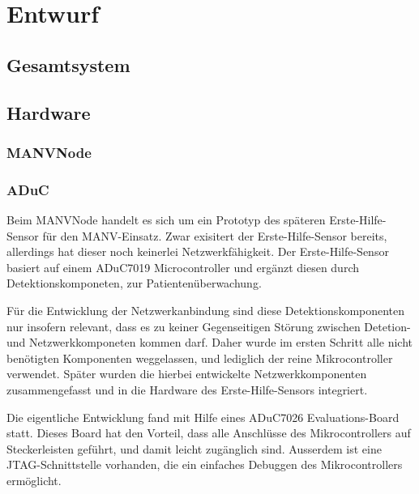 

\chapter{Entwurf}

\section{Gesamtsystem}
\begin{center}
{}
\end{center}


\section{Hardware}
\subsection{MANVNode}

\subsection{ADuC}
Beim MANVNode handelt es sich um ein Prototyp des späteren Erste-Hilfe-Sensor für den MANV-Einsatz. Zwar exisitert der 
Erste-Hilfe-Sensor bereits, allerdings hat dieser noch keinerlei Netzwerkfähigkeit. Der Erste-Hilfe-Sensor basiert
auf einem ADuC7019 Microcontroller und ergänzt diesen durch Detektionskomponeten, zur Patientenüberwachung.

Für die Entwicklung der Netzwerkanbindung sind diese Detektionskomponenten nur insofern relevant, dass es zu keiner
Gegenseitigen Störung zwischen Detetion- und Netzwerkkomponeten kommen darf. Daher wurde im ersten Schritt alle nicht
benötigten Komponenten weggelassen, und lediglich der reine Mikrocontroller verwendet. Später wurden die hierbei
entwickelte Netzwerkkomponenten zusammengefasst und in die Hardware des Erste-Hilfe-Sensors integriert.

Die eigentliche Entwicklung fand mit Hilfe eines ADuC7026 Evaluations-Board statt. Dieses Board hat den Vorteil, 
dass alle Anschlüsse des Mikrocontrollers auf Steckerleisten geführt, und damit leicht zugänglich sind. Ausserdem
ist eine JTAG-Schnittstelle vorhanden, die ein einfaches Debuggen des Mikrocontrollers ermöglicht.


